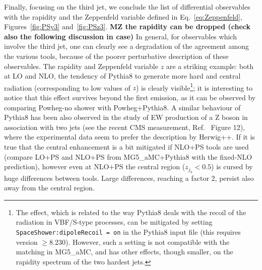Finally, focusing on the third jet, we conclude the list of differential observables with the rapidity and the Zeppenfeld variable defined in Eq.~\eqref{eq:Zeppenfeld}, Figures~\ref{fig:PSy3} and~\ref{fig:PSz3}.
{\bf MZ the rapidity can be dropped (check also the following discussion in case)}
In general, for observables which involve the third jet, one
can clearly see a degradation of the agreement among the various tools, because of the poorer perturbative description of these observables. The rapidity and Zeppenfeld variable $z$
are a striking example: both at LO and NLO, the tendency of {\sc Pythia8} to generate more hard and central radiation (corresponding to low values of $z$)
is clearly visible\footnote{The effect, which is related to the way {\sc Pythia8} deals with the recoil of the radiation in VBF/S-type processes,
can be mitigated by setting {\tt SpaceShower:dipoleRecoil = on} in the {\sc Pythia8} input file (this requires version $\ge8.230$). 
However, such a setting is not compatible with the matching
in {\sc MG5\_aMC}, and has other effects, though smaller, on the rapidity spectrum of the two hardest jets.}; it is interesting to notice that
this effect survives beyond the first emission, as it can be observed by comparing {\sc Powheg-no shower} with {\sc Powheg+Pythia8}. A similar
behaviour of {\sc Pythia8}
has been also observed in the study of EW production of a Z boson in association with two jets (see the recent CMS measurement, 
Ref.~\cite{Sirunyan:2017jej} Figure 12), where the experimental data seem to prefer the description by {\sc Herwig++}. 
If it is true that the central enhancement
is a bit mitigated if NLO+PS tools are used (compare LO+PS and NLO+PS from {\sc MG5\_aMC+Pythia8} with the fixed-NLO prediction), however even at NLO+PS the central region
($z_{j_3}<0.5$) is cursed by huge differences between tools. Large differences, reaching a factor 2, persist also away from the central region. \\


